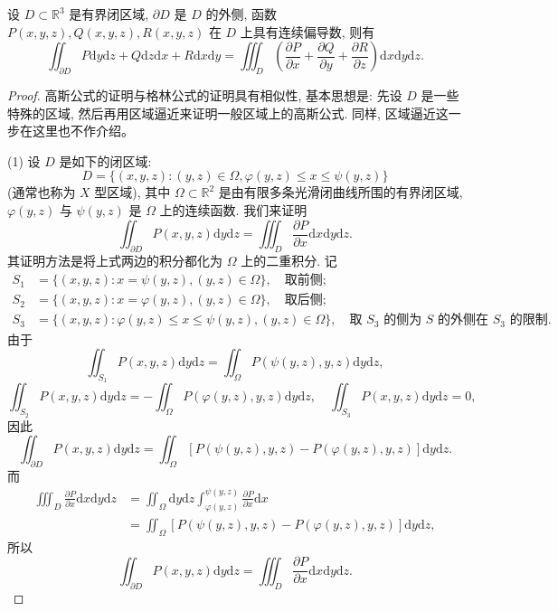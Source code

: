 \documentclass[12pt,fontset=fandol]{ctexart}
\begin{document}
\begin{theorem}[高斯公式]\label{course-theorem-16-5-2}\quad 设 $D\subset\mathbb R^3$ 是有界闭区域, $\partial D$ 是 $D$ 的外侧, 函数\allowbreak $P(x,y,z),Q(x,y,z),R(x,y,z)$ 在 $D$ 上具有连续偏导数, 则有
\[
  \iint_{\partial D}P\mathrm dy\mathrm dz+Q\mathrm dz\mathrm dx+R\mathrm dx\mathrm dy
  =\iiint_D\left(\frac{\partial P}{\partial x}+\frac{\partial Q}{\partial y}
  +\frac{\partial R}{\partial z}\right)\mathrm dx\mathrm dy\mathrm dz.
\]

\end{theorem}
\begin{proof}\quad 高斯公式的证明与格林公式的证明具有相似性, 基本思想是: 先设 $D$ 是一些特殊的区域, 然后再用区域逼近来证明一般区域上的高斯公式. 同样, 区域逼近这一步在这里也不作介绍。

(1) 设 $D$ 是如下的闭区域:
\[
  D=\{(x,y,z):(y,z)\in\Omega,\varphi(y,z)\leqslant x\leqslant\psi(y,z)\}
\]
(通常也称为 $X$ 型区域), 其中 $\Omega\subset\mathbb R^2$ 是由有限多条光滑闭曲线所围的有界闭区域, $\varphi(y,z)$ 与 $\psi(y,z)$ 是 $\Omega$ 上的连续函数. 我们来证明
\[
  \iint_{\partial D}P(x,y,z)\mathrm dy\mathrm dz
  =\iiint_D\frac{\partial P}{\partial x}\mathrm dx\mathrm dy\mathrm dz.
\]
其证明方法是将上式两边的积分都化为 $\Omega$ 上的二重积分. 记
\[
\begin{aligned}
  S_1&=\{(x,y,z):x=\psi(y,z),(y,z)\in\Omega\},\quad \text{取前侧};\\
  S_2&=\{(x,y,z):x=\varphi(y,z),(y,z)\in\Omega\},\quad \text{取后侧};\\
  S_3&=\{(x,y,z):\varphi(y,z)\leqslant x\leqslant\psi(y,z),(y,z)\in\Omega\},
    \quad \text{取 $S_3$ 的侧为 $S$ 的外侧在 $S_3$ 的限制}.
\end{aligned}
\]
由于
\[
  \iint_{S_1}P(x,y,z)\mathrm dy\mathrm dz
  =\iint_\Omega P(\psi(y,z),y,z)\mathrm dy\mathrm dz,
\]
\[
  \iint_{S_2}P(x,y,z)\mathrm dy\mathrm dz
  =-\iint_\Omega P(\varphi(y,z),y,z)\mathrm dy\mathrm dz,\quad
  \iint_{S_3}P(x,y,z)\mathrm dy\mathrm dz=0,
\]
因此
\[
  \iint_{\partial D}P(x,y,z)\mathrm dy\mathrm dz
  =\iint_\Omega[P(\psi(y,z),y,z)-P(\varphi(y,z),y,z)]\mathrm dy\mathrm dz.
\]
而
\[
\begin{aligned}
  \iiint_D\frac{\partial P}{\partial x}\mathrm dx\mathrm dy\mathrm dz
  &=\iint_\Omega\mathrm dy\mathrm dz
    \int_{\varphi(y,z)}^{\psi(y,z)}\frac{\partial P}{\partial x}\mathrm dx\\
  &=\iint_\Omega[P(\psi(y,z),y,z)-P(\varphi(y,z),y,z)]\mathrm dy\mathrm dz,
\end{aligned}
\]
所以
\[
  \iint_{\partial D}P(x,y,z)\mathrm dy\mathrm dz
  =\iiint_D\frac{\partial P}{\partial x}\mathrm dx\mathrm dy\mathrm dz.
\]


\end{proof}
\end{document}
